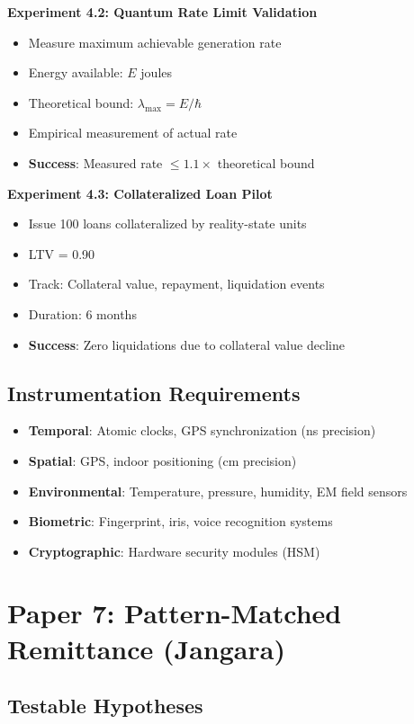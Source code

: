 \documentclass[12pt]{article}
\begin{document}
\textbf{Experiment 4.2: Quantum Rate Limit Validation}
\begin{itemize}
    \item Measure maximum achievable generation rate
    \item Energy available: $E$ joules
    \item Theoretical bound: $\lambda_{\max} = E/\hbar$
    \item Empirical measurement of actual rate
    \item \textbf{Success}: Measured rate $\leq 1.1 \times$ theoretical bound
\end{itemize}

\textbf{Experiment 4.3: Collateralized Loan Pilot}
\begin{itemize}
    \item Issue 100 loans collateralized by reality-state units
    \item LTV = 0.90
    \item Track: Collateral value, repayment, liquidation events
    \item Duration: 6 months
    \item \textbf{Success}: Zero liquidations due to collateral value decline
\end{itemize}

\subsection{Instrumentation Requirements}

\begin{itemize}
    \item \textbf{Temporal}: Atomic clocks, GPS synchronization (ns precision)
    \item \textbf{Spatial}: GPS, indoor positioning (cm precision)
    \item \textbf{Environmental}: Temperature, pressure, humidity, EM field sensors
    \item \textbf{Biometric}: Fingerprint, iris, voice recognition systems
    \item \textbf{Cryptographic}: Hardware security modules (HSM)
\end{itemize}

\section{Paper 7: Pattern-Matched Remittance (Jangara)}

\subsection{Testable Hypotheses}
\end{document}
